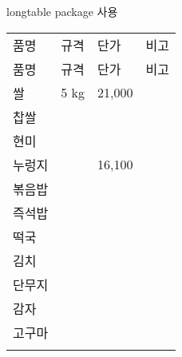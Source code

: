 \documentclass[12pt,a4paper]{report}
\begin{document}
				longtable package 사용


				\begin{longtabu} to 1.0\textwidth { X[r,m, 1.2] X[l,m, 1.6] X[r, 0.8] X[c,m, 1.8] }
				\tabucline[0.2ex]{-}		
				품명				&규격		&단가	&비고\\
				\tabucline[0.1ex]{-}		
				\endfirsthead
				\tabucline[0.2ex]{-}		
				품명				&규격		&단가	&비고\\
				\tabucline[0.1ex]{-}		
				\endhead
				\tabucline[0.1ex]{-}		
				\endfoot
				\tabucline[0.1ex]{-}		
				\endlastfoot
				쌀				& 5 kg		& 21,000	&\\
				찹쌀				&			&		&\\
				현미				&			&		&\\
				누렁지			&			&16,100	&\\
				볶음밥 			&			&		&\\
				즉석밥 			&			&		&\\
				떡국	 			&			&		&\\
				\tabucline[0.01ex]{-}		
				김치				&				&		&\\
				단무지			&				&		&\\
				\tabucline[0.01ex]{-}		
				감자				&				&		&\\
				고구마			&				&		&\\
				\tabucline[0.1ex]{-}		
				\end{longtabu} 


 
\end{document}
